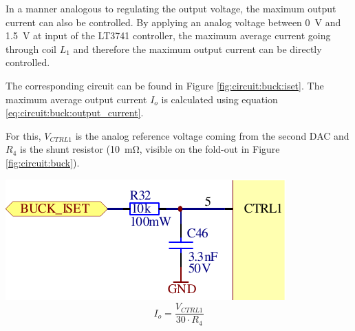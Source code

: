 \begin{minipage}{.50\textwidth}
    In a manner analogous to regulating the output voltage, the maximum output
    current can  also be  controlled.  By applying  an analog  voltage between
    \SI{0}{\volt}  and \SI{1.5}{\volt}  at  input   of the  LT3741
    controller,  the maximum  average  current going  through  coil $L_1$  and
    therefore the maximum output current can be directly controlled.

    The     corresponding    circuit     can     be     found    in     Figure
    \ref{fig:circuit:buck:iset}.  The maximum average  output current $I_o$ is
    calculated using equation \ref{eq:circuit:buck:output_current}.

    For  this, $V_{CTRL1}$  is the  analog reference  voltage coming  from the
    second DAC and  $R_4$ is the shunt  resistor (\SI{10}{\milli\ohm}, visible
    on the fold-out in Figure \ref{fig:circuit:buck}).

\end{minipage}
\begin{minipage}{.50\textwidth}
    \center
    \includegraphics[width=.9\textwidth]{images/circuit/buck-iset.pdf}
    \label{fig:circuit:buck:iset}
    \begin{equation}
        I_o = \frac{V_{CTRL1}}{30 \cdot R_4}
        \label{eq:circuit:buck:output_current}
    \end{equation}
\end{minipage}


